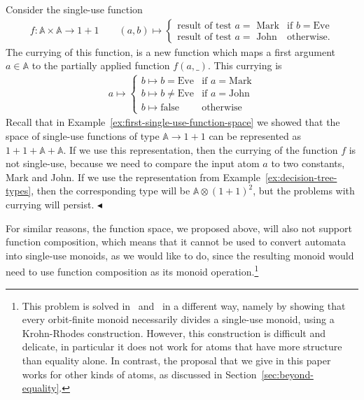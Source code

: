 \documentclass[10pt,a4paper]{amsart}
\numberwithin{equation}{section}
\theoremstyle{plain}
\newcommand{\atoms}{\mathbb A}
\newcommand{\exampleend}{$\blacktriangleleft$}
\begin{document}
\begin{example}\label{ex:currying-not-single-use}
    Consider  the single-use function
    \begin{align*}
    f : \atoms \times \atoms \to 1 + 1 \qquad (a,b)  
    \mapsto \begin{cases}
        \text{result of test $a = $ Mark} & \text{if } b = \text{Eve} \\
        \text{result of test $a = $ John} & \text{otherwise}.
        \end{cases}
    \end{align*}
The currying of this function, is a new function which  maps a first argument $a \in \atoms$ to the partially applied function $f(a,\_)$. This currying is
\begin{align*}
    a \mapsto \begin{cases}
        b \mapsto b = \text{Eve} & \text{if } a = \text{Mark} \\
        b \mapsto b \neq \text{Eve} & \text{if } a = \text{John} \\
        b \mapsto \text{false} & \text{otherwise}
        \end{cases}
\end{align*}
Recall that in Example~\ref{ex:first-single-use-function-space} we showed that the space of single-use functions of type $\atoms \to 1 + 1$ can be represented as $1 + 1 + \atoms + \atoms$. If we use this representation,  then the currying of the function $f$  is not single-use, because we need to compare the input atom $a$ to two constants, Mark and John. If we use the representation from Example~\ref{ex:decision-tree-types}, then the corresponding type will be $\atoms \otimes (1 + 1)^2$, but the problems with currying will persist. \exampleend
\end{example}

For similar reasons, 
the function space, we proposed above, will also not support function composition, which means that it cannot be used to convert automata into single-use monoids, as we would like to do, since the resulting monoid would need to use function composition as its monoid operation.\footnote{This problem is solved in~\cite{bojanczykstefanski2020} and~\cite{stefanski-phd} in a different way, namely by showing that every orbit-finite monoid necessarily divides a single-use monoid, using a  Krohn-Rhodes construction. However, this construction is difficult and delicate, in particular it does not work for atoms that have more structure than equality alone. In contrast, the proposal that we give in this paper works for other kinds of atoms, as discussed in Section~\ref{sec:beyond-equality}. }
\end{document}
